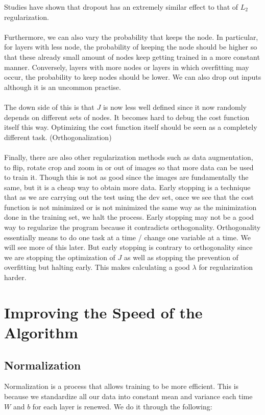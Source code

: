 \documentclass[a4paper]{article}
\begin{document}
\begin{enumerate}
Studies have shown that dropout has an extremely similar effect to that of $L_2$ regularization. \\~\\
Furthermore, we can also vary the probability that keeps the node. In particular, for layers with less node, the probability of keeping the node should be higher so that these already small amount of nodes keep getting trained in a more constant manner. Conversely, layers with more nodes or layers in which overfitting may occur, the probability to keep nodes should be lower. We can also drop out inputs although it is an uncommon practise. \\~\\
The down side of this is that $J$ is now less well defined since it now randomly depends on different sets of nodes. It becomes hard to debug the cost function itself this way. Optimizing the cost function itself should be seen as a completely different task. (Orthogonalization)\\~\\
Finally, there are also other regularization methods such as data augmentation, to flip, rotate crop and zoom in or out of images so that more data can be used to train it. Though this is not as good since the images are fundamentally the same, but it is a cheap way to obtain more data. Early stopping is a technique that as we are carrying out the test using the dev set, once we see that the cost function is not minimized or is not minimized the same way as the minimization done in the training set, we halt the process. 
Early stopping may not be a good way to regularize the program because it contradicts orthogonality. Orthogonality essentially means to do one task at a time / change one variable at a time. We will see more of this later. But early stopping is contrary to orthogonality since we are stopping the optimization of $J$ as well as stopping the prevention of overfitting but halting early. This makes calculating a good $\lambda$ for regularization harder. 

\pagebreak
\section{Improving the Speed of the Algorithm}
\subsection{Normalization}
Normalization is a process that allows training to be more efficient. This is because we standardize all our data into constant mean and variance each time $W$ and $b$ for each layer is renewed. We do it through the following: 


\end{enumerate}
\end{document}
